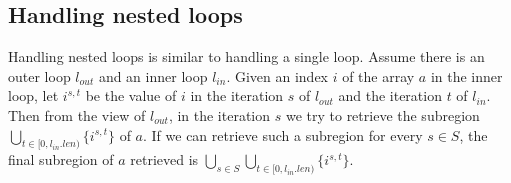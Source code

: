 \subsection{Handling nested loops}
Handling nested loops is similar to handling a single loop.
Assume there is an outer loop $l_{out}$ and an inner loop $l_{in}$.
Given an index $i$ of the array $a$ in the inner loop, let $i^{s,t}$ be the value of $i$ in the iteration $s$ of $l_{out}$ and the iteration $t$ of $l_{in}$.
Then from the view of $l_{out}$, in the iteration $s$ we try to retrieve the subregion $\bigcup_{t\in[0,l_{in}.len)}{\{i^{s,t}\}}$ of $a$.
If we can retrieve such a subregion for every $s\in S$, the final subregion of $a$ retrieved is $\bigcup_{s\in S}\bigcup_{t\in[0,l_{in}.len)}{\{i^{s,t}\}}$.

